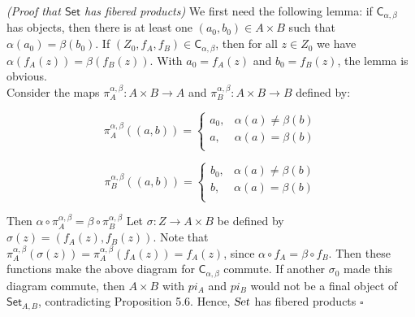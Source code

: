 \documentclass[11pt,a4paper]{article}
\begin{document}
\begin{center}
\end{center}

\noindent \textit{(Proof that $\textsf{Set}$ has fibered products)}  We first need the following lemma: if $\textsf{C}_{\alpha, \beta}$ has objects, then there is at least one $(a_0, b_0) \in A \times B$ such that $\alpha(a_0) = \beta(b_0)$.  If $(Z_0, f_A, f_B) \in \textsf{C}_{\alpha, \beta}$, then for all $z \in Z_0$ we have $\alpha(f_A(z)) = \beta(f_B(z))$.  With $a_0 = f_A(z)$ and $b_0 = f_B(z)$, the lemma is obvious. \\

\noindent Consider the maps $\pi^{\alpha,\beta}_A: A \times B \rightarrow A$ and $\pi^{\alpha,\beta}_B: A \times B \rightarrow B$ defined by:

\[\pi^{\alpha,\beta}_A((a,b)) =   \left\{
\begin{array}{ll}
      a_0, & \alpha(a) \neq \beta(b)  \\
      a, & \alpha(a) = \beta(b) \\
\end{array} 
\right. \]

\[\pi^{\alpha,\beta}_B((a,b)) =   \left\{
\begin{array}{ll}
      b_0, & \alpha(a) \neq \beta(b)  \\
      b, & \alpha(a) = \beta(b) \\
\end{array} 
\right. \]



\noindent  Then $\alpha \circ \pi^{\alpha,\beta}_A = \beta \circ \pi^{\alpha,\beta}_B$ Let $\sigma: Z \rightarrow A \times B$ be defined by $\sigma(z) = (f_A(z), f_B(z))$.  Note that $\pi^{\alpha, \beta}_A(\sigma(z)) = \pi^{\alpha, \beta}_A(f_A(z)) = f_A(z)$, since $\alpha \circ f_A = \beta \circ f_B$. Then these functions make the above diagram for $\textsf{C}_{\alpha, \beta}$ commute.  If another $\sigma_0$ made this diagram commute, then $A \times B$ with $pi_A$ and $pi_B$ would not be a final object of $\textsf{Set}_{A,B}$, contradicting Proposition 5.6.  Hence, $\textsl{Set}$ has fibered products $\square$ \\
\end{document}
